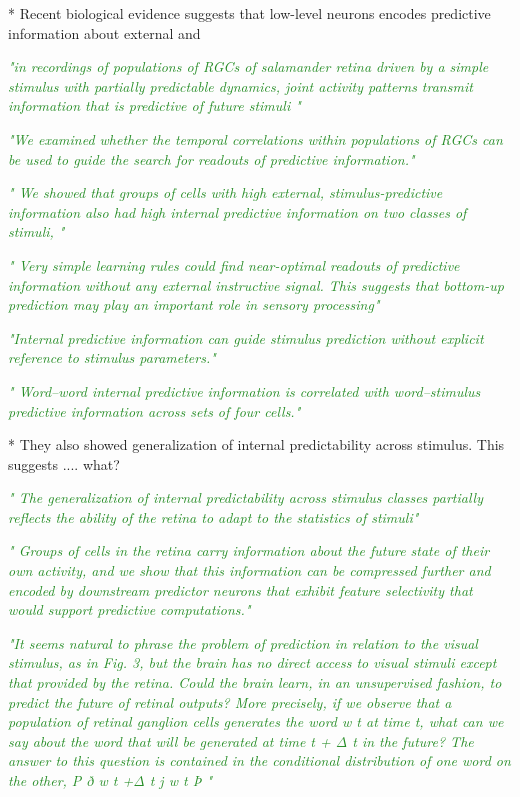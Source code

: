 \documentclass[utf8]{article}
\newcommand{\rewrite}[1]{\textcolor{ForestGreen}{\textit{"#1"}}\newline}
\begin{document}
		* Recent biological evidence suggests that low-level neurons encodes predictive information about external  and 
		
		\cite{sederberg2018learning}
		\rewrite{in recordings of populations of RGCs of salamander retina driven by a simple stimulus with partially predictable dynamics, joint activity patterns transmit information that is predictive of future stimuli }
		
		\rewrite{We examined whether the temporal correlations within populations of RGCs can be used to guide the search for readouts of predictive information.}
		
		\rewrite{ We showed that groups of cells with high external, stimulus-predictive information also had high internal predictive information on two classes of stimuli, }
		
		\rewrite{
			Very simple learning rules could find near-optimal readouts of predictive information without any external instructive signal. This suggests that bottom-up prediction may play an important role in sensory processing}
		
		\rewrite{Internal predictive information can guide stimulus prediction without explicit reference to stimulus parameters.}
		
		\rewrite{ Word–word internal predictive information is correlated with word–stimulus predictive information across sets of four cells.}
		
		* They also showed generalization of internal predictability across stimulus. This suggests .... what?
		
		\rewrite{ The generalization of internal predictability across stimulus classes partially reflects the ability of the retina to adapt to the statistics of stimuli}
		
		
		\cite{Palmer2015}
		\rewrite{ Groups of cells in the retina carry information about the future state of their own activity, and we show that this information can be compressed further and encoded by downstream predictor neurons that exhibit feature selectivity that would support predictive computations.}
		
		
		\rewrite{It seems natural to phrase the problem of prediction in relation to the visual stimulus, as in Fig. 3, but the brain has no direct access to visual stimuli except that provided by the retina. Could the brain learn, in an unsupervised fashion, to predict the future of retinal outputs? More precisely, if we observe that a population of retinal ganglion cells generates the word w t at time t, what can we say about the word that will be generated at time t + Δ t in the future? The answer to this question is contained in the conditional distribution of one word on the other, P ð w t +Δ t j w t Þ }
		
\end{document}
